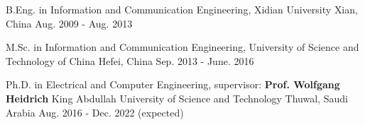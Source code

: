 

%	
%
%
		
\begin{cventries}

  \eduentry
	{B.Eng. in Information and Communication Engineering,} %
	{Xidian University} %
	{Xian, China} %
	{Aug. 2009 - Aug. 2013} %
	{}

  \eduentry
	{M.Sc. in Information and Communication Engineering,} %
	{University of Science and Technology of China} %
	{Hefei, China} %
	{Sep. 2013 - June. 2016} %
	{}

  \eduentry
	{Ph.D. in Electrical and Computer Engineering, supervisor: \textbf{Prof. Wolfgang Heidrich}} %
	{King Abdullah University of Science and Technology} %
	{Thuwal, Saudi Arabia} %
	{Aug. 2016 - Dec. 2022 (expected)} %
	{}
    


\end{cventries}
